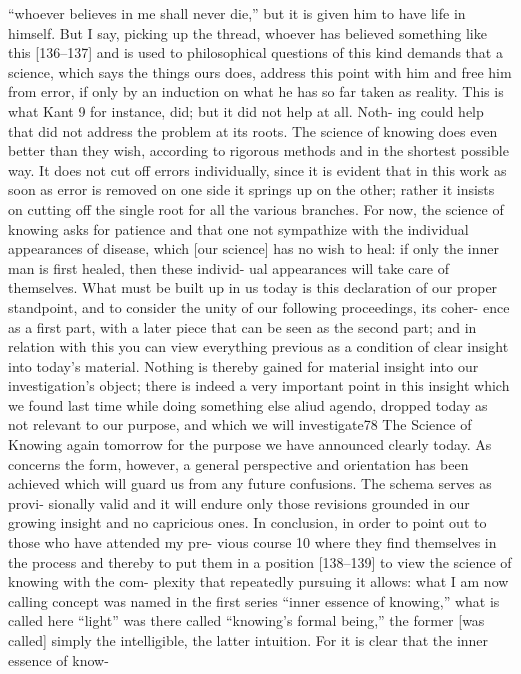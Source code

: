 “whoever believes in me shall never die,” but it is given him to have life in
himself. But I say, picking up the thread, whoever has believed something like
this [136–137] and is used to philosophical questions of this kind demands
that a science, which says the things ours does, address this point with him
and free him from error, if only by an induction on what he has so far taken
as reality. This is what Kant 9 for instance, did; but it did not help at all. Noth-
ing could help that did not address the problem at its roots. The science of
knowing does even better than they wish, according to rigorous methods and
in the shortest possible way. It does not cut off errors individually, since it is
evident that in this work as soon as error is removed on one side it springs up
on the other; rather it insists on cutting off the single root for all the various
branches. For now, the science of knowing asks for patience and that one not
sympathize with the individual appearances of disease, which [our science]
has no wish to heal: if only the inner man is first healed, then these individ-
ual appearances will take care of themselves.
What must be built up in us today is this declaration of our proper
standpoint, and to consider the unity of our following proceedings, its coher-
ence as a first part, with a later piece that can be seen as the second part; and
in relation with this you can view everything previous as a condition of clear
insight into today’s material. Nothing is thereby gained for material insight
into our investigation’s object; there is indeed a very important point in this
insight which we found last time while doing something else {aliud agendo},
dropped today as not relevant to our purpose, and which we will investigate78
The Science of Knowing
again tomorrow for the purpose we have announced clearly today. As concerns
the form, however, a general perspective and orientation has been achieved
which will guard us from any future confusions. The schema serves as provi-
sionally valid and it will endure only those revisions grounded in our growing
insight and no capricious ones.
In conclusion, in order to point out to those who have attended my pre-
vious course 10 where they find themselves in the process and thereby to put
them in a position [138–139] to view the science of knowing with the com-
plexity that repeatedly pursuing it allows: what I am now calling concept was
named in the first series “inner essence of knowing,” what is called here “light”
was there called “knowing’s formal being,” the former [was called] simply the
intelligible, the latter intuition. For it is clear that the inner essence of know-
